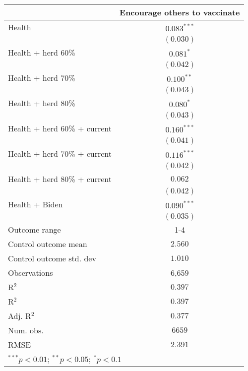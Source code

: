 
\begin{table}
\begin{center}
\begin{tabular}{l c}
\hline
 & Encourage others to vaccinate \\
\hline
Health                       & $0.083^{***}$ \\
                             & $(0.030)$     \\
Health + herd 60\%           & $0.081^{*}$   \\
                             & $(0.042)$     \\
Health + herd 70\%           & $0.100^{**}$  \\
                             & $(0.043)$     \\
Health + herd 80\%           & $0.080^{*}$   \\
                             & $(0.043)$     \\
Health + herd 60\% + current & $0.160^{***}$ \\
                             & $(0.041)$     \\
Health + herd 70\% + current & $0.116^{***}$ \\
                             & $(0.042)$     \\
Health + herd 80\% + current & $0.062$       \\
                             & $(0.042)$     \\
Health + Biden               & $0.090^{***}$ \\
                             & $(0.035)$     \\
\hline
Outcome range                & 1-4           \\
Control outcome mean         & $2.560$       \\
Control outcome std. dev     & $1.010$       \\
Observations                 & 6,659         \\
R$^{2}$                      & $0.397$       \\
R$^2$                        & $0.397$       \\
Adj. R$^2$                   & $0.377$       \\
Num. obs.                    & $6659$        \\
RMSE                         & $2.391$       \\
\hline
\multicolumn{2}{l}{\scriptsize{$^{***}p<0.01$; $^{**}p<0.05$; $^{*}p<0.1$}}
\end{tabular}
\caption{}
\label{table:Tables and Figures/SI_table22_allinfo_pooled_encourage1-4}
\end{center}
\end{table}
